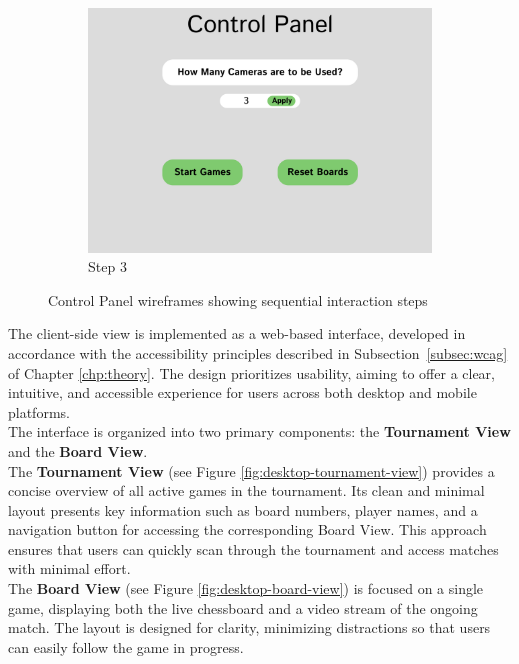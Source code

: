 \begin{figure}[h!]
    \begin{subfigure}[h!]{0.40\linewidth}
        \centering
        \includegraphics[width=\linewidth]{figures/methods/wireframes/control-panel-3.png}
        \caption{Step 3}
        \label{fig:control-panel-3}
    \end{subfigure}
    
    \caption[Control panel wireframes]{Control Panel wireframes showing sequential interaction steps}
    \label{fig:control-panel-group}
\end{figure}


The client-side view is implemented as a web-based interface, developed in accordance with the accessibility principles described in Subsection~\ref{subsec:wcag} of Chapter \ref{chp:theory}. The design prioritizes usability, aiming to offer a clear, intuitive, and accessible experience for users across both desktop and mobile platforms. \\

The interface is organized into two primary components: the \textbf{Tournament View} and the \textbf{Board View}. \\

The \textbf{Tournament View} (see Figure \ref{fig:desktop-tournament-view}) provides a concise overview of all active games in the tournament. Its clean and minimal layout presents key information such as board numbers, player names, and a navigation button for accessing the corresponding Board View. This approach ensures that users can quickly scan through the tournament and access matches with minimal effort. \\

The \textbf{Board View} (see Figure \ref{fig:desktop-board-view}) is focused on a single game, displaying both the live chessboard and a video stream of the ongoing match. The layout is designed for clarity, minimizing distractions so that users can easily follow the game in progress. \\

